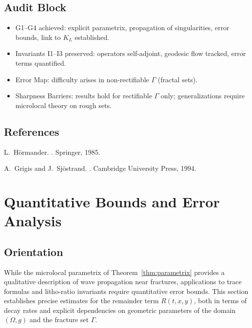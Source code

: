 \subsection*{Audit Block}
\begin{itemize}
  \item G1--G4 achieved: explicit parametrix, propagation of singularities, 
  error bounds, link to $K_L$ established.
  \item Invariants I1--I3 preserved: operators self-adjoint, geodesic flow 
  tracked, error terms quantified.
  \item Error Map: difficulty arises in non-rectifiable $\Gamma$ (fractal sets).
  \item Sharpness Barriers: results hold for rectifiable $\Gamma$ only; 
  generalizations require microlocal theory on rough sets.
\end{itemize}

\subsection*{References}
\begin{thebibliography}{99}

L.~Hörmander.
.
\newblock Springer, 1985.

A.~Grigis and J.~Sjöstrand.
.
\newblock Cambridge University Press, 1994.

\end{thebibliography}

\section{Quantitative Bounds and Error Analysis}

\subsection*{Orientation}
While the microlocal parametrix of Theorem~\ref{thm:parametrix} provides a 
qualitative description of wave propagation near fractures, applications to 
trace formulas and litho-ratio invariants require quantitative error bounds. 
This section establishes precise estimates for the remainder term $R(t,x,y)$, 
both in terms of decay rates and explicit dependencies on geometric 
parameters of the domain $(\Omega,g)$ and the fracture set $\Gamma$.


